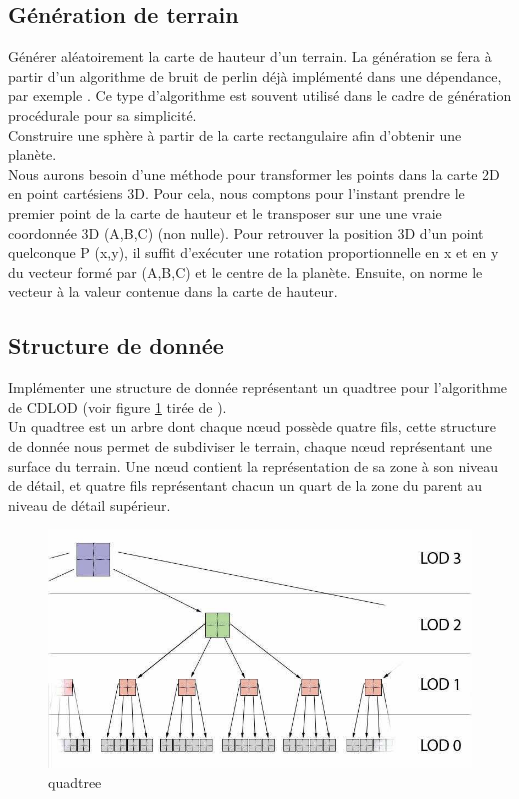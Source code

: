 \documentclass[12pt]{report}
\begin{document}
\subsection{Génération de terrain}

Générer aléatoirement la carte de hauteur d'un terrain.
La génération se fera à partir d'un algorithme de bruit de perlin déjà
implémenté dans une dépendance, par exemple \cite{libnoise}. Ce type
d'algorithme est souvent utilisé dans le cadre de génération
procédurale pour sa simplicité.\\
Construire une sphère à partir de la carte rectangulaire afin d'obtenir
une planète.\\
Nous aurons besoin d'une méthode pour transformer les points dans la
carte 2D en point cartésiens 3D.
Pour cela, nous comptons pour l'instant prendre le premier point de la
carte de hauteur et le transposer sur une une vraie coordonnée 3D (A,B,C) (non
nulle). Pour retrouver la position 3D d'un point quelconque  P (x,y), il suffit
d'exécuter une rotation proportionnelle en x et en y du vecteur formé
par (A,B,C) et le centre de la planète. Ensuite, on norme le vecteur à la
valeur contenue dans la carte de hauteur. 



\subsection{Structure de donnée}

Implémenter une structure de donnée représentant un quadtree pour
l'algorithme de CDLOD (voir figure \ref{fig:quadtree} tirée de 
\cite{CDLOD}).\\
Un quadtree est un arbre dont chaque nœud possède quatre fils, cette
structure de donnée nous permet de subdiviser le terrain, chaque nœud
représentant une surface du terrain. Une nœud contient la représentation
de sa zone à son niveau de détail, et quatre fils représentant chacun un
quart de la zone du parent au niveau de détail supérieur.\\

\begin{figure}[!h]
  \includegraphics[scale=0.5]{img/Quadtree.png}
  \caption{quadtree \cite{CDLOD}}
  \label{fig:quadtree}
\end{figure}
\end{document}
